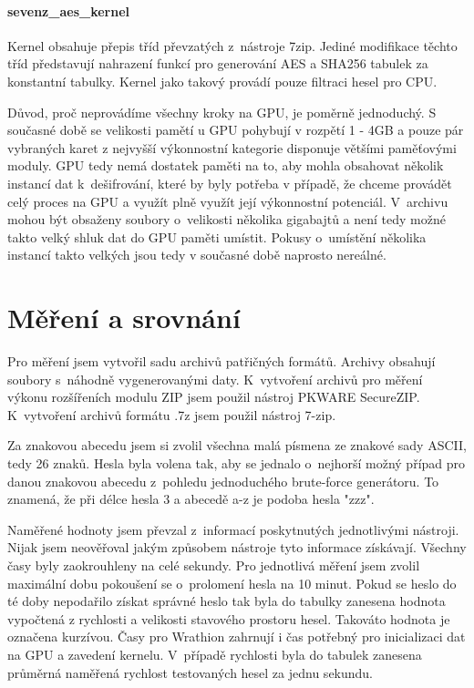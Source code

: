 \subsubsection{sevenz\_aes\_kernel}
Kernel obsahuje přepis tříd převzatých z~nástroje 7zip. Jediné modifikace těchto tříd představují
nahrazení funkcí pro generování AES a SHA256 tabulek za konstantní tabulky. Kernel jako
takový provádí pouze filtraci hesel pro CPU. 

Důvod, proč neprovádíme všechny kroky na GPU, je poměrně jednoduchý. S současné době se velikosti
pamětí u GPU pohybují v rozpětí 1 - 4GB a pouze pár vybraných karet z nejvyšší výkonnostní kategorie
disponuje většími paměťovými moduly. GPU tedy nemá dostatek paměti na to, aby mohla obsahovat
několik instancí dat k~dešifrování, které by byly potřeba v případě, že chceme provádět celý proces na
GPU a využít plně využít její výkonnostní potenciál. V~archivu mohou být obsaženy soubory
o~velikosti několika gigabajtů a není tedy možné takto velký shluk dat do GPU paměti umístit. Pokusy
o~umístění několika instancí takto velkých jsou tedy v současné době naprosto nereálné. 

\chapter{Měření a srovnání}
\label{ch:mereni_a_srovnani}
Pro měření jsem vytvořil sadu archivů patřičných formátů. Archivy obsahují soubory s~náhodně
vygenerovanými daty. K~vytvoření archivů pro měření výkonu rozšířeních modulu ZIP jsem použil
nástroj PKWARE SecureZIP. K~vytvoření archivů formátu .7z jsem použil nástroj 7-zip.

Za znakovou abecedu jsem si zvolil všechna malá písmena ze znakové sady ASCII, tedy 26 znaků.
Hesla byla volena tak, aby se jednalo o~nejhorší možný případ pro danou znakovou abecedu z~pohledu
jednoduchého brute-force generátoru. To znamená, že při délce hesla 3 a abecedě a-z je podoba hesla "zzz".

Naměřené hodnoty jsem převzal z~informací poskytnutých jednotlivými nástroji. Nijak jsem
neověřoval jakým způsobem nástroje tyto informace získávají. Všechny časy byly zaokrouhleny na
celé sekundy. Pro jednotlivá měření jsem zvolil maximální dobu pokoušení se o~prolomení hesla na
10 minut. Pokud se heslo do té doby nepodařilo získat správné heslo tak byla do tabulky zanesena
hodnota vypočtená z rychlosti a velikosti stavového prostoru hesel. Takováto hodnota je označena
kurzívou. Časy pro Wrathion zahrnují i čas potřebný pro inicializaci dat na GPU a zavedení
kernelu. V~případě rychlosti byla do tabulek zanesena průměrná naměřená rychlost testovaných
hesel za jednu sekundu.

